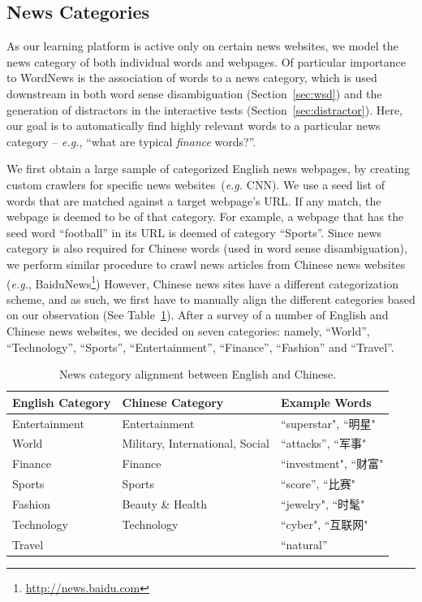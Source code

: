 \begin{CJK}{UTF8}{gbsn}
\subsection{News Categories}
\label{subsec:category}
As our learning platform is active only on certain news websites, we
model the news category of both individual words and webpages. Of
particular importance to WordNews is the association of words to a
news category, which is used downstream in both word sense
disambiguation (Section~\ref{sec:wsd}) and the generation of
distractors in the interactive tests (Section~\ref{sec:distractor}).
Here, our goal is to automatically find highly relevant words to a
particular news category -- {\it e.g.}, ``what are typical {\it finance}
words?''.  

We first obtain a large sample of categorized English news webpages,
by creating custom crawlers for specific news websites~({\it e.g.} CNN).  We use a seed
list of words that are matched against a target webpage's URL.  If any
match, the webpage is deemed to be of that category.  For example, a
webpage that has the seed word ``football'' in its URL is deemed of
category ``Sports''.  
Since news category is  also required for Chinese words (used in word sense disambiguation), we perform similar procedure to crawl news articles from 
Chinese news websites ({\it e.g.}, BaiduNews\footnote{\url{http://news.baidu.com}})
However, Chinese news sites have a
different categorization scheme, and as such, we first have to manually
align the different categories based on our observation (See
Table~\ref{table:cat}).  After a survey of a number of English and
Chinese news websites, we decided on seven categories: namely,
``World'', ``Technology'', ``Sports'', ``Entertainment'', ``Finance'',
``Fashion'' and ``Travel''.
 

\begin{table}[ht]
\centering
  \caption{News category alignment between English and Chinese.}
  \label{table:cat}
  \begin{tabular}{| p{2.2cm} | p{2.2cm} | p{1.8cm} |}
    \hline
    {\bf English \qquad Category} & {\bf Chinese \qquad Category} & {\bf Example Words}\\
    \hline
    Entertainment & Entertainment & ``superstar", ``明星"\\
    \hline
     World &  Military, \qquad International, Social & ``attacks'', ``军事"  \\
    \hline
    Finance & Finance & ``investment", ``财富"\\
    \hline
    Sports & Sports & ``score'', ``比赛" \\
    \hline
    Fashion &  Beauty \& Health & ``jewelry", ``时髦"\\
    \hline
    Technology & Technology  & ``cyber", ``互联网"\\ \hline
    Travel  &  & ``natural'' \\
    \hline
  \end{tabular}
\end{table}




\end{CJK}
